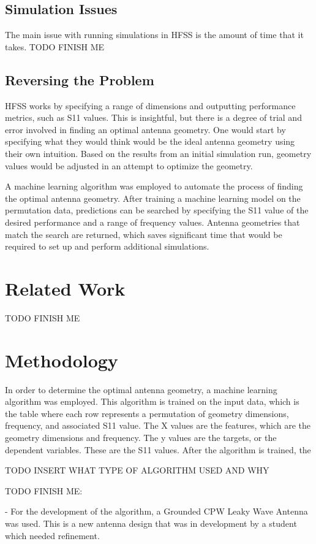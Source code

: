 \documentclass[11pt, notitlepage]{article}
\begin{document}
\begin{multicols}{2}
\subsection{Simulation Issues}
The main issue with running simulations in HFSS is the amount of time that it takes. TODO FINISH ME


\subsection{Reversing the Problem}
HFSS works by specifying a range of dimensions and outputting performance metrics, such as S11 values. This is insightful, but there is a degree of trial and error involved in finding an optimal antenna geometry. One would start by specifying what they would think would be the ideal antenna geometry using their own intuition. Based on the results from an initial simulation run, geometry values would be adjusted in an attempt to optimize the geometry.

A machine learning algorithm was employed to automate the process of finding the optimal antenna geometry. After training a machine learning model on the permutation data, predictions can be searched by specifying the S11 value of the desired performance and a range of frequency values. Antenna geometries that match the search are returned, which saves significant time that would be required to set up and perform additional simulations.  


\section{Related Work}
TODO FINISH ME


\section{Methodology}
In order to determine the optimal antenna geometry, a machine learning algorithm was employed. This algorithm is trained on the input data, which is the table where each row represents a permutation of geometry dimensions, frequency, and associated S11 value. The X values are the features, which are the geometry dimensions and frequency. The y values are the targets, or the dependent variables. These are the S11 values. After the algorithm is trained, the 

TODO INSERT WHAT TYPE OF ALGORITHM USED AND WHY

TODO  FINISH ME:

- For the development of the algorithm, a Grounded CPW Leaky Wave Antenna was used. This is a new antenna design that was in development by a student which needed refinement.


\end{multicols}
\end{document}
